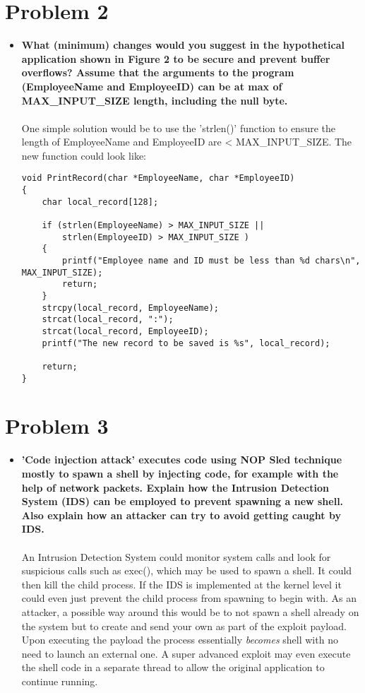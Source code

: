 \documentclass[11pt]{article}
\begin{document}
\newpage
\section*{Problem 2}
\begin{itemize}
    \item \textbf{
            What (minimum) changes would you suggest in  the hypothetical 
            application shown in Figure 2 to be secure and prevent buffer 
            overflows? Assume that the arguments to the program (EmployeeName 
            and  EmployeeID) can be at max of MAX\_INPUT\_SIZE length, 
            including the null byte.
        }\\\\
        One simple solution would be to use the 'strlen()' function to ensure
        the length of EmployeeName and EmployeeID are < MAX\_INPUT\_SIZE. The new
        function could look like:
        \begin{verbatim}
void PrintRecord(char *EmployeeName, char *EmployeeID)
{
    char local_record[128];
    
    if (strlen(EmployeeName) > MAX_INPUT_SIZE ||
        strlen(EmployeeID) > MAX_INPUT_SIZE )
    {
        printf("Employee name and ID must be less than %d chars\n", MAX_INPUT_SIZE);
        return;
    }
    strcpy(local_record, EmployeeName);
    strcat(local_record, ":");
    strcat(local_record, EmployeeID);
    printf("The new record to be saved is %s", local_record);

    return;
}
\end{verbatim}
\end{itemize}

\section*{Problem 3}
\begin{itemize}
    \item \textbf{
            'Code injection attack' executes code using NOP Sled technique 
            mostly to spawn a shell by injecting code, for example with the 
            help of network packets. Explain how the Intrusion Detection 
            System (IDS) can be employed to prevent spawning a new shell. 
            Also explain how an attacker can try to avoid getting caught 
            by IDS.
        }\\\\
        An Intrusion Detection System could monitor system calls and look
        for suspicious calls such as exec(), which may be used to spawn
        a shell. It could then kill the child process. If the IDS is
        implemented at the kernel level it could even just prevent the
        child process from spawning to begin with. As an attacker, a
        possible way around this would be to not spawn a shell already
        on the system but to create and send your own as part of the exploit
        payload. Upon executing the payload the process essentially 
        \emph{becomes} shell with no need to launch an external one. A super
        advanced exploit may even execute the shell code in a separate thread
        to allow the original application to continue running.
\end{itemize}
\end{document}
